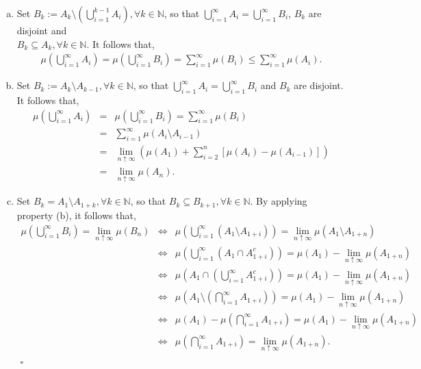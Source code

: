 \documentclass{article}
\begin{document}
\begin{enumerate}[(a)] 
	\item Set $B_k := A_k \setminus (\bigcup_{i=1}^{k-1}A_i), \forall k \in \mathbb{N}$, so that $\bigcup_{i=1}^{\infty}A_i = \bigcup_{i=1}^{\infty}B_i$, $B_k$ are disjoint and \\ $B_k \subseteq A_k, \forall k \in \mathbb{N}$. It follows that,
	\begin{eqnarray}
		\nonumber
		\mu\left(\bigcup_{i=1}^{\infty}A_i\right) = \mu\left(\bigcup_{i=1}^{\infty}B_i\right) = \sum_{i=1}^{\infty}\mu(B_i) \leq \sum_{i=1}^{\infty}\mu(A_i).
	\end{eqnarray}
	\item Set $B_k := A_k \setminus A_{k-1}, \forall k \in \mathbb{N}$, so that $\bigcup_{i=1}^{\infty}A_i = \bigcup_{i=1}^{\infty}B_i$ and $B_k$ are disjoint. It follows that,
	\begin{eqnarray}
		\nonumber
		\mu\left(\bigcup_{i=1}^{\infty}A_i\right) &=& \mu\left(\bigcup_{i=1}^{\infty}B_i\right) = \sum_{i=1}^{\infty}\mu(B_i) \\
		\nonumber
		&=& \sum_{i=1}^{\infty}\mu(A_i \setminus A_{i-1}) \\
		\nonumber
		&=& \lim_{n \uparrow \infty}\left(\mu(A_1) + \sum_{i=2}^{n}\left[\mu(A_i)- \mu(A_{i-1})\right]\right) \\
		\nonumber
		&=& \lim_{n \uparrow \infty}\mu(A_n).
	\end{eqnarray}
	\item Set $B_k = A_1 \setminus A_{1+k}, \forall k \in \mathbb{N}$, so that $B_k \subseteq B_{k+1}, \forall k \in \mathbb{N}$. By applying property (b), it follows that, \\
	\begin{eqnarray}
		\nonumber
		\mu\left(\bigcup_{i=1}^{\infty}B_i\right) = \lim_{n \uparrow \infty}\mu(B_n) &\iff& \mu\left(\bigcup_{i=1}^{\infty}(A_1 \setminus A_{1+i})\right) = \lim_{n \uparrow \infty}\mu(A_1 \setminus A_{1+n}) \\
		\nonumber
		&\iff& \mu\left(\bigcup_{i=1}^{\infty}(A_1 \cap A_{1+i}^c)\right) = \mu(A_1) - \lim_{n \uparrow \infty}\mu(A_{1+n}) \\
		\nonumber
		&\iff& \mu\left(A_1 \cap \left(\bigcup_{i=1}^{\infty}A_{1+i}^c\right)\right) = \mu(A_1) - \lim_{n \uparrow \infty}\mu(A_{1+n}) \\
		\nonumber
		&\iff& \mu\left(A_1 \setminus \left(\bigcap_{i=1}^{\infty}A_{1+i}\right)\right) = \mu(A_1) - \lim_{n \uparrow \infty}\mu(A_{1+n}) \\
		\nonumber
		&\iff& \mu(A_1) - \mu\left(\bigcap_{i=1}^{\infty}A_{1+i}\right) = \mu(A_1) - \lim_{n \uparrow \infty}\mu(A_{1+n}) \\
		\nonumber
		&\iff& \mu\left(\bigcap_{i=1}^{\infty}A_{1+i}\right) = \lim_{n \uparrow \infty}\mu(A_{1+n}).
	\end{eqnarray}
	${}$ \hfill $\square$
\end{enumerate}
\end{document}
